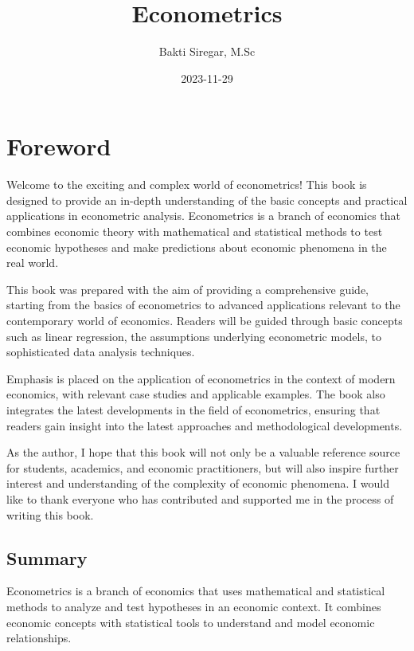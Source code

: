 \documentclass[
]{book}
\title{Econometrics}
\author{Bakti Siregar, M.Sc}
\date{2023-11-29}
\begin{document}
\maketitle

{
\setcounter{tocdepth}{1}
\tableofcontents
}
\hypertarget{foreword}{%
\chapter*{Foreword}\label{foreword}}

Welcome to the exciting and complex world of econometrics! This book is designed to provide an in-depth understanding of the basic concepts and practical applications in econometric analysis. Econometrics is a branch of economics that combines economic theory with mathematical and statistical methods to test economic hypotheses and make predictions about economic phenomena in the real world.

This book was prepared with the aim of providing a comprehensive guide, starting from the basics of econometrics to advanced applications relevant to the contemporary world of economics. Readers will be guided through basic concepts such as linear regression, the assumptions underlying econometric models, to sophisticated data analysis techniques.

Emphasis is placed on the application of econometrics in the context of modern economics, with relevant case studies and applicable examples. The book also integrates the latest developments in the field of econometrics, ensuring that readers gain insight into the latest approaches and methodological developments.

As the author, I hope that this book will not only be a valuable reference source for students, academics, and economic practitioners, but will also inspire further interest and understanding of the complexity of economic phenomena. I would like to thank everyone who has contributed and supported me in the process of writing this book.

\hypertarget{summary}{%
\section*{Summary}\label{summary}}

Econometrics is a branch of economics that uses mathematical and statistical methods to analyze and test hypotheses in an economic context. It combines economic concepts with statistical tools to understand and model economic relationships.
\end{document}
